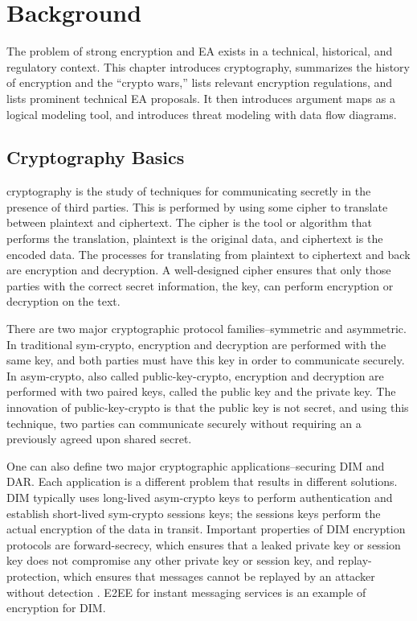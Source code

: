 \chapter{Background}
\label{chap-background}

The problem of strong encryption and \acl{EA} exists in a technical, historical, and regulatory context. This chapter
introduces cryptography, summarizes the history of encryption and the ``crypto wars,'' lists relevant encryption
regulations, and lists prominent technical \ac{EA} proposals. It then introduces argument maps as a logical modeling
tool, and introduces threat modeling with data flow diagrams.



\section{Cryptography Basics}
\label{sec-crypto-basics}

\Ac{cryptography} is the study of techniques for communicating secretly in the presence of third parties. This is
performed by using some \ac{cipher} to translate between \ac{plaintext} and \ac{ciphertext}. The cipher is the tool or
algorithm that performs the translation, plaintext is the original data, and ciphertext is the encoded data. The
processes for translating from plaintext to ciphertext and back are \ac{encryption} and \ac{decryption}. A well-designed
cipher ensures that only those parties with the correct secret information, the \ac{key}, can perform encryption or
decryption on the text.


There are two major cryptographic protocol families--symmetric and asymmetric. In traditional \ac{sym-crypto},
encryption and decryption are performed with the same key, and both parties must have this key in order to communicate
securely. In \ac{asym-crypto}, also called \ac{public-key-crypto}, encryption and decryption are performed with two
paired keys, called the public key and the private key. The innovation of \ac{public-key-crypto} is that the public key
is not secret, and using this technique, two parties can communicate securely without requiring an a previously agreed
upon shared secret.

One can also define two major cryptographic applications--securing \acf{DIM} and \acf{DAR}. Each application is a
different problem that results in different solutions. \Ac{DIM} typically uses long-lived \ac{asym-crypto} keys to
perform authentication and establish short-lived \ac{sym-crypto} sessions keys; the sessions keys perform the actual
encryption of the data in transit. Important properties of \ac{DIM} encryption protocols are \ac{forward-secrecy}, which
ensures that a leaked private key or session key does not compromise any other private key or session key, and
\ac{replay-protection}, which ensures that messages cannot be replayed by an attacker without detection
\cite{bellovin_thinking_2016}. \Ac{E2EE} for instant messaging services is an example of encryption for \ac{DIM}.


